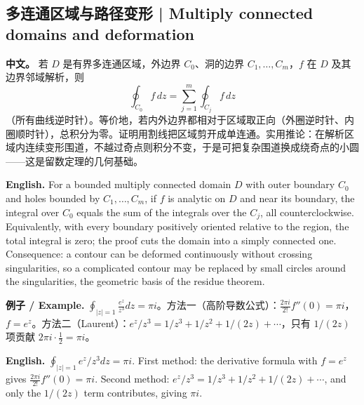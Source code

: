 \documentclass[UTF8,11pt,a4paper]{ctexart}
\newcommand{\EN}[1]{\par\noindent \textbf{English.} #1\par}
\newcommand{\EX}[2]{\par\noindent \textbf{例子 / Example.} #1\par\EN{#2}}
\newcommand{\APS}[2]{\par\noindent\textbf{中文。} #1\par\noindent\textbf{English.} #2\par\smallskip}
\begin{document}
\subsection{多连通区域与路径变形 | Multiply connected domains and deformation}
\APS{若 $D$ 是有界多连通区域，外边界 $C_0$、洞的边界 $C_1,\dots,C_m$，$f$ 在 $D$ 及其边界邻域解析，则
\[
\oint_{C_0}f\,dz=\sum_{j=1}^{m}\oint_{C_j}f\,dz
\]
（所有曲线逆时针）。等价地，若内外边界都相对于区域取正向（外圈逆时针、内圈顺时针），总积分为零。证明用割线把区域剪开成单连通。实用推论：在解析区域内连续变形围道，不越过奇点则积分不变，于是可把复杂围道换成绕奇点的小圆——这是留数定理的几何基础。}{For a bounded multiply connected domain $D$ with outer boundary $C_0$ and holes bounded by $C_1,\dots,C_m$, if $f$ is analytic on $D$ and near its boundary, the integral over $C_0$ equals the sum of the integrals over the $C_j$, all counterclockwise. Equivalently, with every boundary positively oriented relative to the region, the total integral is zero; the proof cuts the domain into a simply connected one. Consequence: a contour can be deformed continuously without crossing singularities, so a complicated contour may be replaced by small circles around the singularities, the geometric basis of the residue theorem.}
\EX{$\oint_{|z|=1}\frac{e^z}{z^3}dz=\pi i$。方法一（高阶导数公式）：$\frac{2\pi i}{2!}f''(0)=\pi i$，$f=e^z$。方法二（Laurent）：$e^z/z^3=1/z^3+1/z^2+1/(2z)+\cdots$，只有 $1/(2z)$ 项贡献 $2\pi i\cdot\frac12=\pi i$。}{$\oint_{|z|=1}e^z/z^3dz=\pi i$. First method: the derivative formula with $f=e^z$ gives $\frac{2\pi i}{2!}f''(0)=\pi i$. Second method: $e^z/z^3=1/z^3+1/z^2+1/(2z)+\cdots$, and only the $1/(2z)$ term contributes, giving $\pi i$.}
\end{document}
